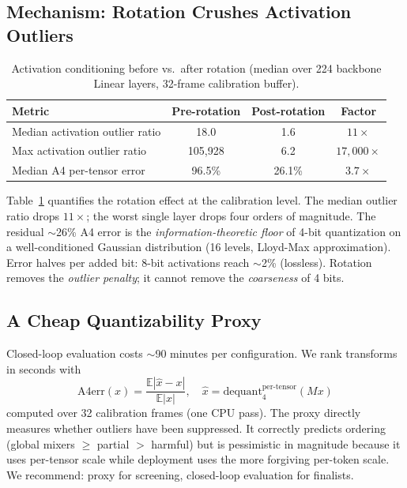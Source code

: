 \documentclass[conference]{IEEEtran}
\begin{document}
\subsection{Mechanism: Rotation Crushes Activation Outliers}
\label{sec:mech}

\begin{table}[h]\centering\small
\caption{Activation conditioning before vs.\ after rotation (median over 224 backbone
Linear layers, 32-frame calibration buffer).}
\label{tab:mech}
\begin{tabular}{lccc}
\toprule
Metric & Pre-rotation & Post-rotation & Factor \\
\midrule
Median activation outlier ratio & 18.0 & 1.6 & $11\times$ \\
Max activation outlier ratio & 105{,}928 & 6.2 & $17{,}000\times$ \\
Median A4 per-tensor error & 96.5\% & 26.1\% & $3.7\times$ \\
\bottomrule
\end{tabular}
\end{table}

Table~\ref{tab:mech} quantifies the rotation effect at the calibration level. The median
outlier ratio drops $11\times$; the worst single layer drops four orders of magnitude. The
residual $\sim$26\% A4 error is the \emph{information-theoretic floor} of 4-bit
quantization on a well-conditioned Gaussian distribution (16 levels, Lloyd-Max
approximation). Error halves per added bit: 8-bit activations reach $\sim$2\% (lossless).
Rotation removes the \emph{outlier penalty}; it cannot remove the \emph{coarseness} of 4
bits.

\subsection{A Cheap Quantizability Proxy}
\label{sec:proxy}

Closed-loop evaluation costs $\sim$90 minutes per configuration. We rank transforms in
seconds with
\begin{equation}
  \mathrm{A4err}(x) = \frac{\mathbb{E}|\hat{x} - x|}{\mathbb{E}|x|}, \quad
  \hat{x} = \mathrm{dequant}_{4}^{\mathrm{per\text{-}tensor}}(Mx)
\end{equation}
computed over 32 calibration frames (one CPU pass). The proxy directly measures whether
outliers have been suppressed. It correctly predicts ordering (global mixers $\geq$
partial $>$ harmful) but is pessimistic in magnitude because it uses per-tensor scale
while deployment uses the more forgiving per-token scale. We recommend: proxy for
screening, closed-loop evaluation for finalists.
\end{document}
